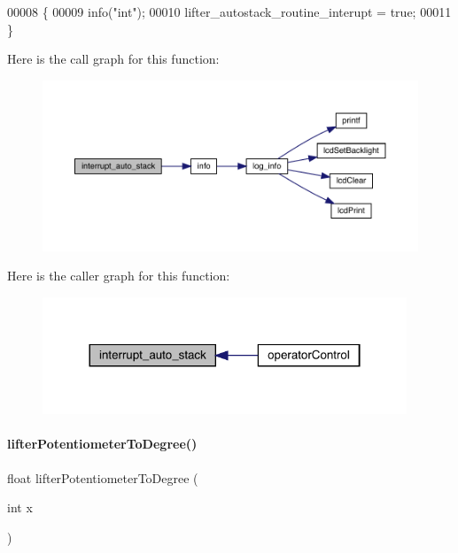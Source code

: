 \begin{DoxyCode}
00008                                        \{
00009   info(\textcolor{stringliteral}{"int"});
00010   lifter_autostack_routine_interupt = \textcolor{keyword}{true};
00011 \}
\end{DoxyCode}
Here is the call graph for this function\+:
\nopagebreak
\begin{figure}[H]
\begin{center}
\leavevmode
\includegraphics[width=350pt]{lifter_8c_a3738d33dc870f98243a93bddd855b43e_cgraph}
\end{center}
\end{figure}
Here is the caller graph for this function\+:
\nopagebreak
\begin{figure}[H]
\begin{center}
\leavevmode
\includegraphics[width=308pt]{lifter_8c_a3738d33dc870f98243a93bddd855b43e_icgraph}
\end{center}
\end{figure}
\mbox{\label{lifter_8c_ab0460888f3213e5510bd25ae1e152a75}} 
\paragraph{lifter\+Potentiometer\+To\+Degree()}
{\footnotesize\ttfamily float lifter\+Potentiometer\+To\+Degree (\begin{DoxyParamCaption}\item[{int}]{x }\end{DoxyParamCaption})}



